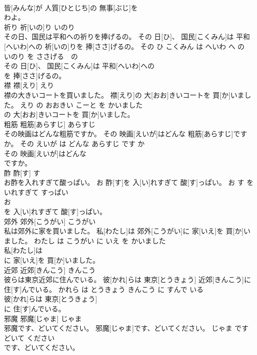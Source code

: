 \documentclass[8pt]{extreport}
\begin{document}
\begin{CJK}{UTF8}{min}
\\	皆[みんな]が 人質[ひとじち]の 無事[ぶじ]を
\\	わよ。			
\\	祈り	祈[いの]り	いのり	
\\	その日、国民は平和への祈りを捧げるの。	その 日[ひ]、 国民[こくみん]は 平和[へいわ]への 祈[いの]りを 捧[ささ]げるの。	その ひ こくみん は へいわ へ の いのり を ささげる　の	
\\	その 日[ひ]、 国民[こくみん]は 平和[へいわ]への
\\	を 捧[ささ]げるの。			
\\	襟	襟[えり]	えり	
\\	襟の大きいコートを買いました。	襟[えり]の 大[おお]きいコートを 買[か]いました。	えり の おおきい こーと を かいました	
\\	の 大[おお]きいコートを 買[か]いました。			
\\	粗筋	粗筋[あらすじ]	あらすじ	
\\	その映画はどんな粗筋ですか。	その 映画[えいが]はどんな 粗筋[あらすじ]ですか。	その えいが は どんな あらすじ です か	
\\	その 映画[えいが]はどんな
\\	ですか。			
\\	酢	酢[す]	す	
\\	お酢を入れすぎて酸っぱい。	お 酢[す]を 入[い]れすぎて 酸[す]っぱい。	お す を いれすぎて すっぱい	
\\	お
\\	を 入[い]れすぎて 酸[す]っぱい。			
\\	郊外	郊外[こうがい]	こうがい	
\\	私は郊外に家を買いました。	私[わたし]は 郊外[こうがい]に 家[いえ]を 買[か]いました。	わたし は こうがい に いえ を かいました	
\\	私[わたし]は
\\	に 家[いえ]を 買[か]いました。			
\\	近郊	近郊[きんこう]	きんこう	
\\	彼らは東京近郊に住んでいる。	彼[かれ]らは 東京[とうきょう] 近郊[きんこう]に 住[す]んでいる。	かれら は とうきょう きんこう に すんで いる	
\\	彼[かれ]らは 東京[とうきょう]
\\	に 住[す]んでいる。			
\\	邪魔	邪魔[じゃま]	じゃま	
\\	邪魔です、どいてください。	邪魔[じゃま]です、どいてください。	じゃま です どいて ください	
\\	です、どいてください。			

\end{CJK}
\end{document}

